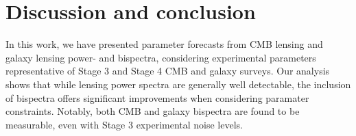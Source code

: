 \documentclass[11pt]{article} %
\begin{document}


\pagebreak



\section{Discussion and conclusion}\label{sec:discussion}
In this work, we have presented parameter forecasts from CMB lensing and galaxy lensing power- and bispectra, considering experimental parameters representative of Stage 3 and Stage 4 CMB and galaxy surveys. Our analysis shows that while lensing power spectra are generally well detectable, the inclusion of bispectra offers significant improvements when considering paramater constraints. Notably, both CMB and galaxy bispectra are found to be measurable, even with Stage 3 experimental noise levels.
\end{document}
